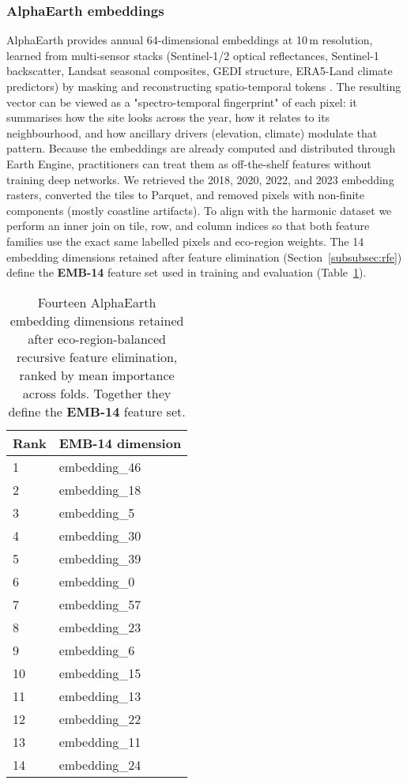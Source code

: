 \documentclass[utf8]{FrontiersinHarvard}
\begin{document}
\subsubsection{AlphaEarth embeddings}
AlphaEarth provides annual 64-dimensional embeddings at 10\,m resolution, learned from multi-sensor stacks (Sentinel-1/2 optical reflectances, Sentinel-1 backscatter, Landsat seasonal composites, GEDI structure, ERA5-Land climate predictors) by masking and reconstructing spatio-temporal tokens \citep{AlphaEarth2025}. The resulting vector can be viewed as a "spectro-temporal fingerprint" of each pixel: it summarises how the site looks across the year, how it relates to its neighbourhood, and how ancillary drivers (elevation, climate) modulate that pattern. Because the embeddings are already computed and distributed through Earth Engine, practitioners can treat them as off-the-shelf features without training deep networks. We retrieved the 2018, 2020, 2022, and 2023 embedding rasters, converted the tiles to Parquet, and removed pixels with non-finite components (mostly coastline artifacts). To align with the harmonic dataset we perform an inner join on tile, row, and column indices so that both feature families use the exact same labelled pixels and eco-region weights. The 14 embedding dimensions retained after feature elimination (Section~\ref{subsubsec:rfe}) define the \textbf{EMB-14} feature set used in training and evaluation (Table~\ref{tab:emb14}).

\begin{table}[H]
    \centering
    \small
    \begin{tabular}{ll}
        \hline
        \textbf{Rank} & \textbf{EMB-14 dimension} \\
        \hline
        1 & embedding\_46 \\
        2 & embedding\_18 \\
        3 & embedding\_5 \\
        4 & embedding\_30 \\
        5 & embedding\_39 \\
        6 & embedding\_0 \\
        7 & embedding\_57 \\
        8 & embedding\_23 \\
        9 & embedding\_6 \\
        10 & embedding\_15 \\
        11 & embedding\_13 \\
        12 & embedding\_22 \\
        13 & embedding\_11 \\
        14 & embedding\_24 \\
        \hline
    \end{tabular}
    \caption{Fourteen AlphaEarth embedding dimensions retained after eco-region-balanced recursive feature elimination, ranked by mean importance across folds. Together they define the \textbf{EMB-14} feature set.}
    \label{tab:emb14}
\end{table}
\end{document}
